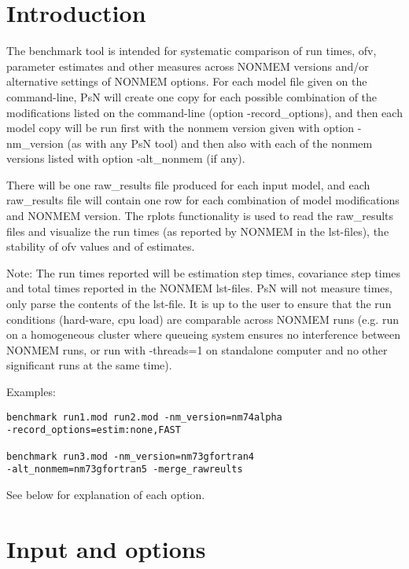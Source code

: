 




\maketitle
\newcommand{\guidetoolname}{benchmark}


\section{Introduction}
The benchmark tool is intended for systematic comparison of run times, ofv, parameter estimates and other measures
across NONMEM versions and/or alternative settings of NONMEM options.
For each model file given on the command-line, PsN will create one copy for each possible combination
of the modifications listed on the command-line (option -record\_options), and
then each model copy will be run first with the nonmem version given
with option -nm\_version (as with any PsN tool) and then also with
each of the nonmem versions listed with option -alt\_nonmem (if any).

There will be one raw\_results file produced for each input model, and each raw\_results file will contain one row
for each combination of model modifications and NONMEM version. The rplots functionality is used to
read the raw\_results files and
visualize the run times (as reported by NONMEM in the lst-files), the stability of ofv values and of estimates.

Note: The run times reported will be estimation step times, covariance step times and total times reported in the NONMEM lst-files.
PsN will not measure times, only parse the contents of the lst-file. It is up to the user to ensure that the run conditions 
(hard-ware, cpu load) are comparable across NONMEM runs (e.g. run on a homogeneous cluster where queueing system ensures no interference 
between NONMEM runs, or run with -threads=1 on standalone computer and no other significant runs at the same time).

Examples:
\begin{verbatim}
benchmark run1.mod run2.mod -nm_version=nm74alpha 
-record_options=estim:none,FAST

benchmark run3.mod -nm_version=nm73gfortran4 
-alt_nonmem=nm73gfortran5 -merge_rawreults
\end{verbatim}
See below for explanation of each option.

\section{Input and options}

